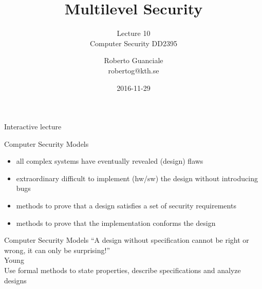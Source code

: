 \documentclass{beamer}
\title{Multilevel Security}
\subtitle{Lecture 10 \\ Computer Security DD2395}
\author[R. Guanciale]{
  Roberto Guanciale\\
  robertog@kth.se
}
\date{2016-11-29}
\begin{document}
\begin{frame}[plain]
  \titlepage
\end{frame}

\begin{frame}{Interactive lecture}
\end{frame}

\begin{frame}{Computer Security Models}
  \begin{itemize}
  \item all complex systems have eventually revealed (design) flaws 
  \item extraordinary difficult to implement (hw/sw) the design
    without introducing bugs
  \item methods to prove that a design satisfies a set of security requirements
  \item methods to prove that the implementation conforms the design
  \end{itemize}
\end{frame}

\begin{frame}{Computer Security Models}
``A design without specification cannot be right or wrong,
  it can only be surprising!''
  \\[10pt]
  Young
  \\[10pt]
  Use formal methods to state properties, describe specifications
  and analyze designs
\end{frame}
\end{document}
